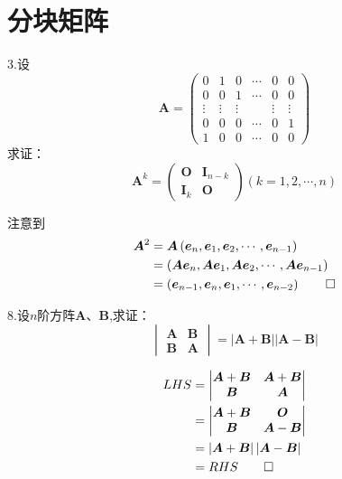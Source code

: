 \section{分块矩阵}
3.设
\[
\bm{A}=\begin{pmatrix}
	0&1&0&\cdots&0&0\\
	0&0&1&\cdots&0&0\\
	\vdots&\vdots&\vdots&&\vdots&\vdots\\
	0&0&0&\cdots&0&1\\
	1&0&0&\cdots&0&0
\end{pmatrix}
\]
求证：
\[
\bm{A}^k=\begin{pmatrix}
	\bm{O}&\bm{I}_{n-k}\\
	\bm{I}_k&\bm{O}
\end{pmatrix}\left(k=1,2,\cdots,n\right)
\]
\begin{Proof}
注意到\begin{align*}
	\bm{A}^2&=\bm{A}\left(\bm{e}_n,\bm{e}_1,\bm{e}_2,\cdots,\bm{e}_{n-1}\right)\\
	&=\left(\bm{A}\bm{e}_n,\bm{A}\bm{e}_1,\bm{A}\bm{e}_2,\cdots,\bm{A}\bm{e}_{n-1}\right)\\
	&=\left(\bm{e}_{n-1},\bm{e}_n,\bm{e}_1,\cdots,\bm{e}_{n-2}\right)\qedhere
\end{align*}
\end{Proof}

8.设$n$阶方阵$\bm{A}$、$\bm{B}$,求证：
\[
\begin{vmatrix}
	\bm{A}&\bm{B}\\\bm{B}&\bm{A}
\end{vmatrix}=\left|\bm{A}+\bm{B}\right|\left|\bm{A}-\bm{B}\right|
\]
\begin{Proof}
\begin{align*}
	LHS&=\begin{vmatrix}
		\bm{A}+\bm{B}&\bm{A}+\bm{B}\\\bm{B}&\bm{A}
	\end{vmatrix}\\
	&=\begin{vmatrix}
		\bm{A}+\bm{B}&\bm{O}\\\bm{B}&\bm{A}-\bm{B}
	\end{vmatrix}\\
	&=\left|\bm{A}+\bm{B}\right|\left|\bm{A}-\bm{B}\right|\\
	&=RHS\qedhere
\end{align*}
\end{Proof}

